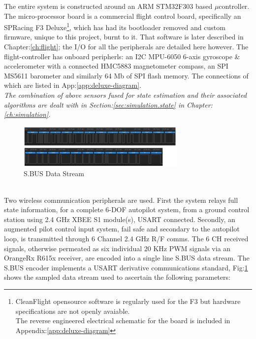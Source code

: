 The entire system is constructed around an ARM STM32F303\cite{stm32f303} based $\mu$controller. The micro-processor board is a commercial flight control board, specifically an SPRacing F3 Deluxe\cite{spracing}\footnote{CleanFlight opensource software is regularly used for the F3 but hardware specifications are not openly avaiable.\\The reverse engineered electrical schematic for the board is included in Appendix:\ref{app:deluxe-diagram}}, which has had its bootloader removed and custom firmware, unique to this project, burnt to it. That software is later described in Chapter:\ref{ch:flight}; the I/O for all the peripherals are detailed here however. The flight-controller has onboard peripherls: an I2C MPU-6050\cite{mpu6050} 6-axis gyroscope \& accelerometer with a connected HMC5883\cite{hmc5883} magnetometer compass, an SPI MS5611\cite{ms5611} barometer and similarly 64 Mb of SPI flash memory. The connections of which are listed in App:\ref{app:deluxe-diagram}. 
\\
\emph{\color{Gray} The combination of above sensors fused for state estimation and their associated algorithms are dealt with in Section:\ref{sec:simulation.state} in Chapter:\ref{ch:simulation}.}
\begin{figure}[hbtp]
\centering
\includegraphics[width=\textwidth]{figs/sbus}
\caption{S.BUS Data Stream}
\label{fig:sbus}
\end{figure}
\\
Two wireless communication peripherals are used. First the system relays full state information, for a complete 6-DOF autopilot system, from a ground control station using 2.4 GHz XBEE S1 module(s)\cite{xbees1}, USART connected. Secondly, an augmented pilot control input system, fail safe and secondary to the autopilot loop, is transmitted through 6 Channel 2.4 GHz R/F comms. The 6 CH received signals, otherwise permeated as six individual 20 KHz PWM signals via an OrangeRx R615x\cite{r615x} receiver, are encoded into a single line S.BUS data stream. 
\newpage
The S.BUS encoder \cite{sbusencoder} implements a USART derivative communications standard, Fig:\ref{fig:sbus} shows the sampled data stream used to ascertain the following parameters:
